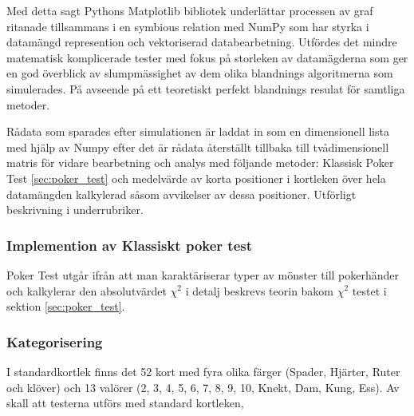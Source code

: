 \documentclass[swedish,a4paper]{article}
\begin{document}
Med detta sagt Pythons Matplotlib bibliotek underlättar processen av
graf ritanade tillsammans i en symbious relation med NumPy som har styrka i
datamängd represention och vektoriserad data\-bearbetning. Utfördes det
mindre matematisk komplicerade tester med fokus på storleken av
datamägderna som ger en god överblick av slumpmässighet av dem olika
blandnings algoritmerna som simulerades. På avseende på ett teoretiskt
perfekt blandnings resulat för samtliga metoder.


Rådata som sparades efter simulationen är laddat in som en dimensionell
lista med hjälp av Numpy  efter det är rådata återställt tillbaka till
tvådimensionell matris för vidare bearbetning och analys med följande
metoder: Klassisk Poker Test \ref{sec:poker_test} och medelvärde av
korta positioner i kortleken över hela datamängden kalkylerad såsom
avvikelser av dessa positioner. Utförligt beskrivning i underrubriker. 

\subsubsection{Implemention av Klassiskt poker test}
Poker Test utgår ifrån att man karaktäriserar typer av mönster till 
pokerhänder och kalkylerar  den absolutvärdet $\chi^2$ i detalj beskrevs
teorin bakom $\chi^2$ testet i sektion
\ref{sec:poker_test}. 

\subsubsection*{Kategorisering}
I standardkortlek finns det 52 kort med fyra olika 
färger (Spader, Hjärter, Ruter och klöver) och 13 valörer 
(2, 3, 4, 5, 6, 7, 8, 9, 10, Knekt, Dam, Kung, Ess).
Av skall att testerna utförs med standard kortleken,
\end{document}
